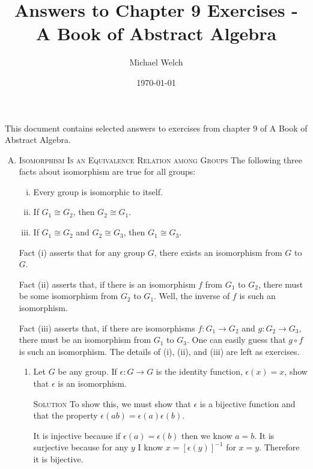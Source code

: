 \documentclass[twoside]{amsart}
\newcommand{\solution}{\textsc{Solution}\xspace}
\newcommand{\iso}{\cong}
\newcommand{\blank}{\vspace{5pt}}
\begin{document}
\title{Answers to Chapter 9 Exercises - A Book of Abstract Algebra}
\author{Michael Welch}
\date{\today}
\maketitle

This document contains selected answers to exercises from chapter 9
of A Book of Abstract Algebra.


\begin{enumerate}[A.]
   \item \textsc{Isomorphism Is an Equivalence Relation among Groups}
   The following three facts about isomorphism are true for all groups:

   \blank
   \begin{enumerate}[(i)]
      \item Every group is isomorphic to itself.
      \item If $G_1 \iso G_2$, then $G_2 \iso G_1$.
      \item If $G_1 \iso G_2$ and $G_2 \iso G_3$, then $G_1 \iso G_3$.
   \end{enumerate}
   \blank

   Fact (i) asserts that for any group $G$, there exists an isomorphism 
   from $G$ to $G$.

   Fact (ii) asserts that, if there is an isomorphism $f$ from $G_1$ to
   $G_2$, there must be some isomorphism from $G_2$ to $G_1$. Well, the
   inverse of $f$ is such an isomorphism.

   Fact (iii) asserts that, if there are isomorphisms $f : G_1 \to G_2$ and
   $g : G_2 \to G_3$, there must be an isomorphism from $G_1$ to $G_3$. One can
   easily guess that $g \circ f$ is such an isomorphism. The details of
   (i), (ii), and (iii) are left as exercises.
   \blank

   \begin{enumerate}[1]
   
   \item Let $G$ be any group. If $\epsilon : G \to G$ is the identity
   function, $\epsilon(x) = x$, show that $\epsilon$ is an isomorphism.

   \blank \noindent \solution To show this, we must show that
   $\epsilon$ is a bijective function and that the property
   $\epsilon(ab)=\epsilon(a)\epsilon(b)$.

   It is injective because if $\epsilon(a)=\epsilon(b)$ then we know
   $a=b$. It is surjective because for any $y$ I know $x = [\epsilon(y)]^{-1}$
   for $x=y$. Therefore it is bijective.


\end{enumerate}
\end{enumerate}
\end{document}
